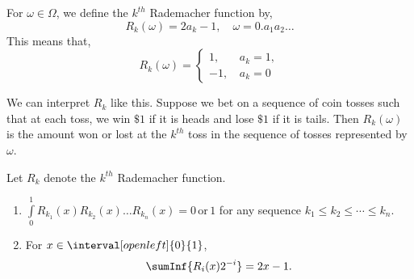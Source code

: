 \begin{Definition}[name=Rademacher function]
    For $\omega \in \Omega$, we define the $k^{th}$ Rademacher function by,
    \begin{equation*}
	R_k(\omega) = 2a_k -1,\quad \omega = 0.a_1a_2\dots
    \end{equation*}
    This means that,
    \begin{equation*}
	R_k(\omega) = 
	\begin{cases}
	    1,\,&a_k = 1,\\
	    -1,\,&a_k = 0
	\end{cases}
    \end{equation*}
\end{Definition}
We can interpret $R_k$ like this. Suppose we bet on a sequence of coin tosses such that at each toss,
we win $\$1$ if it is heads and lose $\$1$ if it is tails. Then $R_k(\omega)$ is the amount won or
lost at the $k^{th}$ toss in the sequence of tosses represented by $\omega$.
\begin{Proposition}\label{prop:rademacher}
    Let $R_k$ denote the $k^{th}$ Rademacher function.
    \begin{enumerate}
	\item
	    $ \int\limits_{0}^{1}R_{k_1}(x)R_{k_2}(x)\dots R_{k_n}(x) = 0\,\text{or}\,1$
	    for any sequence $k_1 \leq k_2 \leq \cdots \leq k_n$. 
	\item
	   For $x \in \interval[open left]{0}{1}$, 
	    \[ \sumInf{R_i(x)2^{-i}} = 2x - 1. \]
    \end{enumerate}
\end{Proposition}
